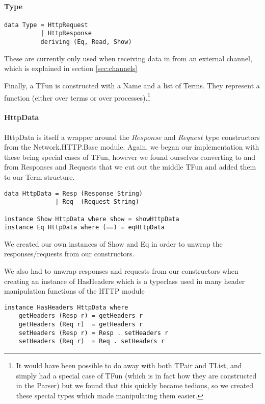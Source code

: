 \paragraph{Type}
\begin{verbatim}
data Type = HttpRequest
          | HttpResponse
          deriving (Eq, Read, Show)
\end{verbatim}
These are currently only used when receiving data in from an external channel, which is explained in section \ref{sec:channels}

Finally, a TFun is constructed with a Name and a list of Terms. They represent a function (either over terms or over processes).\footnote{It would have been possible to do away with both TPair and TList, and simply had a special case of TFun (which is in fact how they are constructed in the Parser) but we found that this quickly became tedious, so we created these special types which made manipulating them easier.}

\paragraph{HttpData}
\label{para:httpdata}

HttpData is itself a wrapper around the $Response$ and $Request$ type constructors from the Network.HTTP.Base \cite{hack:httpBase} module. Again, we began our implementation with these being special cases of TFun, however we found ourselves converting to and from Responses and Requests that we cut out the middle TFun and added them to our Term structure.
\begin{verbatim}
data HttpData = Resp (Response String)
              | Req  (Request String)

instance Show HttpData where show = showHttpData
instance Eq HttpData where (==) = eqHttpData
\end{verbatim}

We created our own instances of Show and Eq in order to unwrap the responses/requests from our constructors. 

We also had to unwrap responses and requests from our constructors when creating an instance of HasHeaders \cite{hack:headers} which is a typeclass used in many header manipulation functions of the HTTP module
\begin{verbatim}
instance HasHeaders HttpData where
    getHeaders (Resp r) = getHeaders r
    getHeaders (Req r)  = getHeaders r
    setHeaders (Resp r) = Resp . setHeaders r
    setHeaders (Req r)  = Req . setHeaders r
\end{verbatim}

